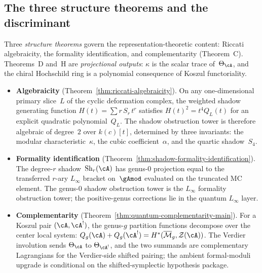 \subsection*{The three structure theorems and the discriminant}
\label{sec:concordance-structure-and-discriminant}

Three \emph{structure theorems} govern the
representation-theoretic content:
Riccati algebraicity, the formality identification, and
complementarity (Theorem~C).
Theorems~D and~H are \emph{projectional outputs}: $\kappa$ is the scalar
trace of~$\Theta_\cA$, and the chiral Hochschild ring is a
polynomial consequence of Koszul functoriality.

\begin{itemize}
\item \textbf{Algebraicity}
 (Theorem~\ref{thm:riccati-algebraicity}).
 On any one-dimensional primary slice~$L$ of the cyclic
 deformation complex, the weighted shadow generating function
 $H(t) = \sum r\,S_r\,t^r$ satisfies
 $H(t)^2 = t^4 Q_L(t)$
 for an explicit quadratic polynomial~$Q_L$.
 The shadow obstruction tower is therefore algebraic of degree~$2$
 over $k(c)[t]$, determined by three invariants:
 the modular characteristic~$\kappa$, the cubic coefficient~$\alpha$,
 and the quartic shadow~$S_4$.

\item \textbf{Formality identification}
 (Theorem~\ref{thm:shadow-formality-identification}).
 The degree-$r$ shadow~$\operatorname{Sh}_r(\cA)$ has genus-$0$
 projection equal to the transferred $r$-ary $L_\infty$
 bracket on~$\gAmod$ evaluated on the truncated MC element.
 The genus-$0$ shadow obstruction tower is the $L_\infty$ formality
 obstruction tower; the positive-genus corrections lie in the
 quantum $L_\infty$ layer.

\item \textbf{Complementarity}
 (Theorem~\ref{thm:quantum-complementarity-main}).
 For a Koszul pair $(\cA, \cA^!)$, the genus-$g$ partition
 functions decompose over the center local system:
 $Q_g(\cA) + Q_g(\cA^!) =
 H^*(\overline{\mathcal{M}}_g, \mathcal{Z}(\cA))$.
 The Verdier involution sends $\Theta_\cA$ to $\Theta_{\cA^!}$,
 and the two summands are complementary Lagrangians for the
 Verdier-side shifted pairing; the ambient formal-moduli
 upgrade is conditional on the shifted-symplectic hypothesis package.
\end{itemize}


